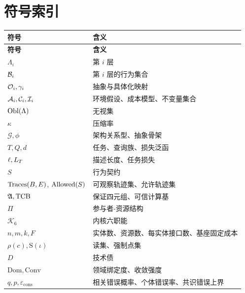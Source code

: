 \section*{符号索引}

\begin{longtable}{L{3.0cm}L{11.4cm}}
\toprule
\textbf{符号} & \textbf{含义} \\
\midrule
\endfirsthead
\toprule
\textbf{符号} & \textbf{含义} \\
\midrule
\endhead
\bottomrule
\endlastfoot
$\Lambda_i$ & 第 $i$ 层 \\
$\mathcal{B}_i$ & 第 $i$ 层的行为集合 \\
$\mathcal{O}_i, \gamma_i$ & 抽象与具体化映射 \\
$\mathcal{A}_i, \mathcal{C}_i, \mathcal{I}_i$ & 环境假设、成本模型、不变量集合 \\
$\operatorname{Obl}(\Lambda)$ & 无视集 \\
$\kappa$ & 压缩率 \\
$\mathcal{G}, \phi$ & 架构关系型、抽象骨架 \\
$T, Q, d$ & 任务、查询族、损失泛函 \\
$\ell, L_T$ & 描述长度、任务损失 \\
$S$ & 行为契约 \\
$\operatorname{Traces}(B,E)$, $\operatorname{Allowed}(S)$ & 可观察轨迹集、允许轨迹集 \\
$\mathfrak{A}, \mathrm{TCB}$ & 保证四元组、可信计算基 \\
$\Pi$ & 参与者-资源结构 \\
$\mathcal{K}_6$ & 内核六职能 \\
$n, m, k, F$ & 实体数、资源数、每实体接口数、基座固定成本 \\
$\rho(c), \mathrm{S}(\iota)$ & 读集、强制点集 \\
$D$ & 技术债 \\
$\mathrm{Dom}, \mathrm{Conv}$ & 领域绑定度、收敛强度 \\
$q, p, \varepsilon_{\text{cons}}$ & 相关错误概率、个体错误率、共识错误上界 \\
\bottomrule
\end{longtable}
